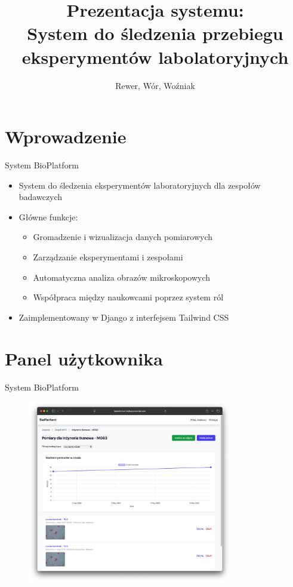 \documentclass[polish,aspectratio=1610]{beamer}
\title{Prezentacja systemu:\\System do śledzenia przebiegu eksperymentów labolatoryjnych}
\author{Rewer, Wór, Woźniak}
\date{}
\begin{document}
    \maketitle



    \section{Wprowadzenie}
    \begin{frame}{System BioPlatform}
        \begin{itemize}
            \item System do śledzenia eksperymentów laboratoryjnych dla zespołów badawczych
            \item Główne funkcje:
            \begin{itemize}
                \item Gromadzenie i wizualizacja danych pomiarowych
                \item Zarządzanie eksperymentami i zespołami
                \item Automatyczna analiza obrazów mikroskopowych
                \item Współpraca między naukowcami poprzez system ról
            \end{itemize}
            \item Zaimplementowany w Django z interfejsem Tailwind CSS
        \end{itemize}
    \end{frame}



    \section{Panel użytkownika}
    \begin{frame}{System BioPlatform}
        \begin{figure}
            \includegraphics[width=0.8\textwidth]{screenshot.png}
        \end{figure}
    \end{frame}
\end{document}
